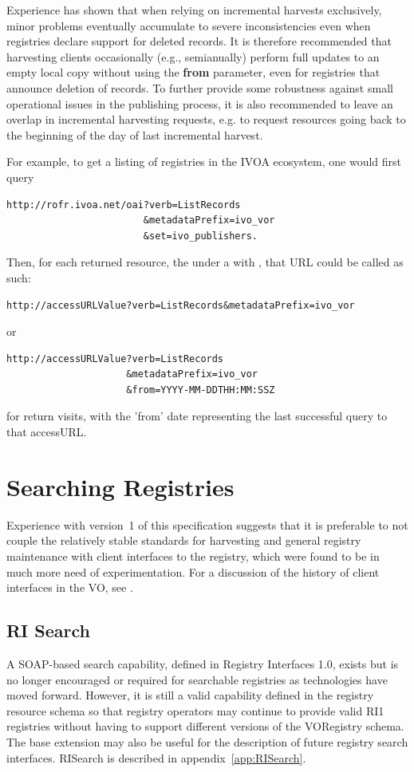 \documentclass{ivoa}
\begin{document}
Experience has shown that when relying on incremental harvests
exclusively, minor problems eventually accumulate to severe
inconsistencies even when registries declare support for deleted
records.  It is therefore recommended that harvesting clients occasionally
(e.g., semianually) perform full updates to an empty local copy without 
using the \textbf{from} parameter, even for registries that announce
deletion of records. To further provide some robustness against small
operational issues in the publishing process, it is also recommended 
to leave an overlap in incremental harvesting requests, e.g. to request 
resources going back to the beginning of the day of last incremental harvest.


For example, to get a listing of registries in the IVOA ecosystem, one
would first query
\begin{verbatim}
http://rofr.ivoa.net/oai?verb=ListRecords
                        &metadataPrefix=ivo_vor
                        &set=ivo_publishers.
\end{verbatim}


Then, for each returned resource, the  under a
 with , that URL could be
called as such:

\begin{verbatim}
http://accessURLValue?verb=ListRecords&metadataPrefix=ivo_vor
\end{verbatim}
or
\begin{verbatim}
http://accessURLValue?verb=ListRecords
                     &metadataPrefix=ivo_vor
                     &from=YYYY-MM-DDTHH:MM:SSZ
\end{verbatim}
for return visits, with the 'from' date representing the last successful
query to that accessURL. 

\section{Searching Registries}
\label{sect:searching}

Experience with version~1 of this specification suggests that it is
preferable to not couple the relatively stable standards for harvesting and
general registry maintenance with client interfaces to the registry,
which were found to be in much more need of experimentation.  For a
discussion of the history of client interfaces in the VO, see
\citet{paper:regclient}.

\subsection{RI Search}
\label{RISearch}
A SOAP-based search capability,  defined in Registry 
Interfaces 1.0, exists but is no longer encouraged or required for searchable
registries as technologies have moved forward. However, it is still a valid
capability defined in the registry resource schema so that registry  operators 
may continue to provide valid RI1 registries without having to support different 
versions of the VORegistry schema. The base  extension may 
also be useful for the description of future registry search interfaces. RISearch 
is described in appendix~\ref{app:RISearch}.
\end{document}
